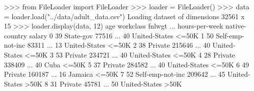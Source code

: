 \documentclass[]{article}
\newenvironment{Shaded}{\begin{snugshade}}{\end{snugshade}}
\newcommand{\DecValTok}[1]{\textcolor[rgb]{0.96,0.45,0.00}{#1}}
\newcommand{\ImportTok}[1]{\textcolor[rgb]{0.15,0.68,0.38}{#1}}
\newcommand{\KeywordTok}[1]{\textcolor[rgb]{0.81,0.81,0.76}{#1}}
\newcommand{\NormalTok}[1]{\textcolor[rgb]{0.81,0.81,0.76}{#1}}
\newcommand{\OperatorTok}[1]{\textcolor[rgb]{0.81,0.81,0.76}{#1}}
\newcommand{\StringTok}[1]{\textcolor[rgb]{0.96,0.31,0.31}{#1}}
\begin{document}
\begin{Shaded}
\begin{Highlighting}[]
\OperatorTok{>>>} \ImportTok{from}\NormalTok{ FileLoader }\ImportTok{import}\NormalTok{ FileLoader}
\OperatorTok{>>>}\NormalTok{ loader }\OperatorTok{=}\NormalTok{ FileLoader()}
\OperatorTok{>>>}\NormalTok{ data }\OperatorTok{=}\NormalTok{ loader.load(}\StringTok{"../data/adult_data.csv"}\NormalTok{)}
\NormalTok{Loading dataset of dimensions }\DecValTok{32561}\NormalTok{ x }\DecValTok{15}
\OperatorTok{>>>}\NormalTok{ loader.display(data, }\DecValTok{12}\NormalTok{)}
\NormalTok{age         workclass  fnlwgt  ... hours}\OperatorTok{-}\NormalTok{per}\OperatorTok{-}\NormalTok{week  native}\OperatorTok{-}\NormalTok{country salary}
\DecValTok{0}    \DecValTok{39}\NormalTok{         State}\OperatorTok{-}\NormalTok{gov   }\DecValTok{77516}\NormalTok{  ...             }\DecValTok{40}\NormalTok{   United}\OperatorTok{-}\NormalTok{States  }\OperatorTok{<=}\NormalTok{50K}
\DecValTok{1}    \DecValTok{50}\NormalTok{  Self}\OperatorTok{-}\NormalTok{emp}\OperatorTok{-}\KeywordTok{not}\OperatorTok{-}\NormalTok{inc   }\DecValTok{83311}\NormalTok{  ...             }\DecValTok{13}\NormalTok{   United}\OperatorTok{-}\NormalTok{States  }\OperatorTok{<=}\NormalTok{50K}
\DecValTok{2}    \DecValTok{38}\NormalTok{           Private  }\DecValTok{215646}\NormalTok{  ...             }\DecValTok{40}\NormalTok{   United}\OperatorTok{-}\NormalTok{States  }\OperatorTok{<=}\NormalTok{50K}
\DecValTok{3}    \DecValTok{53}\NormalTok{           Private  }\DecValTok{234721}\NormalTok{  ...             }\DecValTok{40}\NormalTok{   United}\OperatorTok{-}\NormalTok{States  }\OperatorTok{<=}\NormalTok{50K}
\DecValTok{4}    \DecValTok{28}\NormalTok{           Private  }\DecValTok{338409}\NormalTok{  ...             }\DecValTok{40}\NormalTok{            Cuba  }\OperatorTok{<=}\NormalTok{50K}
\DecValTok{5}    \DecValTok{37}\NormalTok{           Private  }\DecValTok{284582}\NormalTok{  ...             }\DecValTok{40}\NormalTok{   United}\OperatorTok{-}\NormalTok{States  }\OperatorTok{<=}\NormalTok{50K}
\DecValTok{6}    \DecValTok{49}\NormalTok{           Private  }\DecValTok{160187}\NormalTok{  ...             }\DecValTok{16}\NormalTok{         Jamaica  }\OperatorTok{<=}\NormalTok{50K}
\DecValTok{7}    \DecValTok{52}\NormalTok{  Self}\OperatorTok{-}\NormalTok{emp}\OperatorTok{-}\KeywordTok{not}\OperatorTok{-}\NormalTok{inc  }\DecValTok{209642}\NormalTok{  ...             }\DecValTok{45}\NormalTok{   United}\OperatorTok{-}\NormalTok{States   }\OperatorTok{>}\NormalTok{50K}
\DecValTok{8}    \DecValTok{31}\NormalTok{           Private   }\DecValTok{45781}\NormalTok{  ...             }\DecValTok{50}\NormalTok{   United}\OperatorTok{-}\NormalTok{States   }\OperatorTok{>}\NormalTok{50K}

\end{Highlighting}
\end{Shaded}
\end{document}
